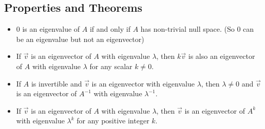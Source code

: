 \subsection{Properties and Theorems}
\begin{itemize}
    \item $0$ is an eigenvalue of $A$ if and only if $A$ has non-trivial null space. (So 0 can be an eigenvalue but not an eigenvector)
    \item If $\vec{v}$ is an eigenvector of $A$ with eigenvalue $\lambda$, then $k\vec{v}$ is also an eigenvector of $A$ with eigenvalue $\lambda$ for any scalar $k \neq 0$.
    \item If $A$ is invertible and $\vec{v}$ is an eigenvector with eigenvalue $\lambda$, then $\lambda \neq 0$ and $\vec{v}$ is an eigenvector of $A^{-1}$ with eigenvalue $\lambda^{-1}$.
    \item If $\vec{v}$ is an eigenvector of $A$ with eigenvalue $\lambda$, then $\vec{v}$ is an eigenvector of $A^k$ with eigenvalue $\lambda^k$ for any positive integer $k$.
\end{itemize}







\newpage
